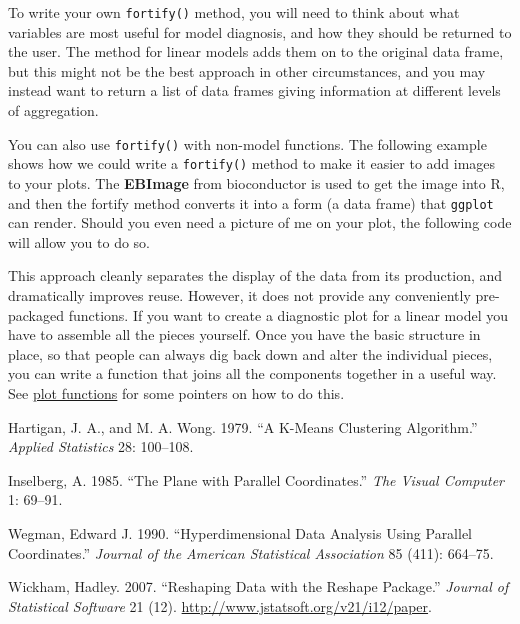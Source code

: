To write your own \texttt{fortify()} method, you will need to think
about what variables are most useful for model diagnosis, and how they
should be returned to the user. The method for linear models adds them
on to the original data frame, but this might not be the best approach
in other circumstances, and you may instead want to return a list of
data frames giving information at different levels of aggregation.

You can also use \texttt{fortify()} with non-model functions. The
following example shows how we could write a \texttt{fortify()} method
to make it easier to add images to your plots. The \textbf{EBImage} from
bioconductor is used to get the image into R, and then the fortify
method converts it into a form (a data frame) that \texttt{ggplot} can
render. Should you even need a picture of me on your plot, the following
code will allow you to do so. 

\begin{Shaded}
\begin{Highlighting}[]
\NormalTok{(}\NormalTok{)}
\StringTok{ }\NormalTok{()}
\NormalTok{(}
\StringTok{ }
\StringTok{ }\NormalTok{)}
\NormalTok{(}\NormalTok{:}\NormalTok{, }\NormalTok{:}\NormalTok{, } \NormalTok{) +}\StringTok{ }
\StringTok{  }
\end{Highlighting}
\end{Shaded}

This approach cleanly separates the display of the data from its
production, and dramatically improves reuse. However, it does not
provide any conveniently pre-packaged functions. If you want to create a
diagnostic plot for a linear model you have to assemble all the pieces
yourself. Once you have the basic structure in place, so that people can
always dig back down and alter the individual pieces, you can write a
function that joins all the components together in a useful way. See
\hyperref[sec:functions]{plot functions} for some pointers on how to do
this.

Hartigan, J. A., and M. A. Wong. 1979. ``A K-Means Clustering
Algorithm.'' \emph{Applied Statistics} 28: 100--108.

Inselberg, A. 1985. ``The Plane with Parallel Coordinates.'' \emph{The
Visual Computer} 1: 69--91.

Wegman, Edward J. 1990. ``Hyperdimensional Data Analysis Using Parallel
Coordinates.'' \emph{Journal of the American Statistical Association} 85
(411): 664--75.

Wickham, Hadley. 2007. ``Reshaping Data with the Reshape Package.''
\emph{Journal of Statistical Software} 21 (12).
\url{http://www.jstatsoft.org/v21/i12/paper}.
